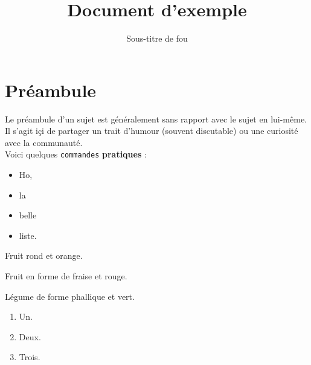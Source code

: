 \documentclass{42}
\begin{document}
                           \title{Document d'exemple}
                          \subtitle{Sous-titre de fou}


\maketitle

\tableofcontents


\chapter{Préambule}

    Le pr\'eambule d'un sujet est g\'en\'eralement sans rapport avec
    le sujet en lui-m\^eme. Il s'agit i\c ci de partager un trait
    d'humour (souvent discutable) ou une curiosit\'e avec la
    communaut\'e.\\

    Voici quelques \texttt{commandes} \textbf{pratiques} :\\

    \begin{itemize}\itemsep1pt
        \item Ho,
        \item la
        \item belle
        \item liste.
    \end{itemize}

    \begin{description}\itemsep3pt
        \item [Orange :] Fruit rond et orange.
        \item [Fraise :] Fruit en forme de fraise et rouge.
        \item [Comcombre :] L\'egume de forme phallique et vert.
    \end{description}

    \begin{enumerate}\itemsep7pt
        \item Un.
        \item Deux.
        \item Trois.
    \end{enumerate}
\end{document}
